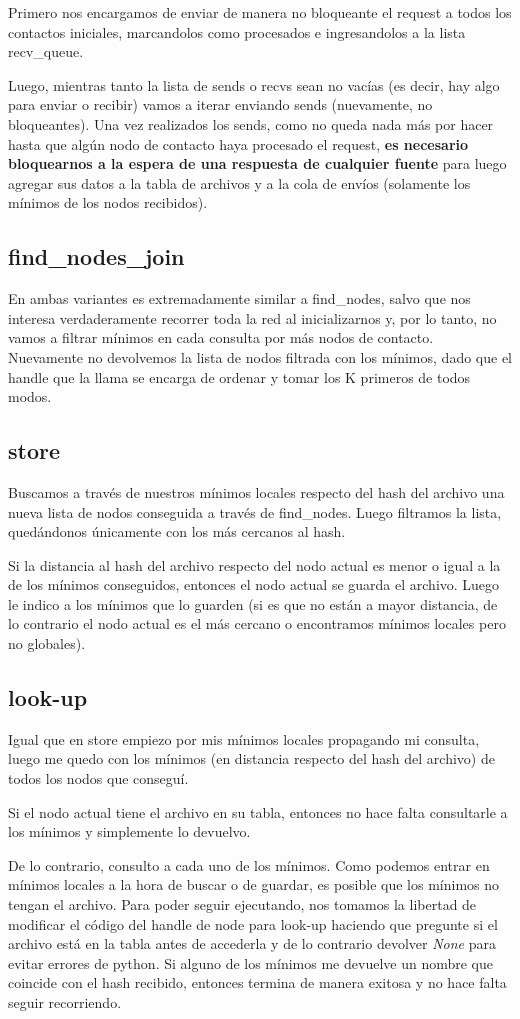             Primero nos encargamos de enviar de manera no bloqueante el request a todos los contactos iniciales, marcandolos como procesados e ingresandolos a la lista recv\_queue.

            Luego, mientras tanto la lista de sends o recvs sean no vacías (es decir, hay algo para enviar o recibir) vamos a iterar enviando sends (nuevamente, no bloqueantes). Una vez realizados los sends, como no queda nada más por hacer hasta que algún nodo de contacto haya procesado el request, \textbf{es necesario bloquearnos a la espera de una respuesta de cualquier fuente} para luego agregar sus datos a la tabla de archivos y a la cola de envíos (solamente los mínimos de los nodos recibidos).

    \subsection{find\_nodes\_join}
            En ambas variantes es extremadamente similar a find\_nodes, salvo que nos interesa verdaderamente recorrer toda la red al inicializarnos y, por lo tanto, no vamos a filtrar mínimos en cada consulta por más nodos de contacto. Nuevamente no devolvemos la lista de nodos filtrada con los mínimos, dado que el handle que la llama se encarga de ordenar y tomar los K primeros de todos modos.

    \subsection{store}
            Buscamos a través de nuestros mínimos locales respecto del hash del archivo una nueva lista de nodos conseguida a través de find\_nodes. Luego filtramos la lista, quedándonos únicamente con los más cercanos al hash.

            Si la distancia al hash del archivo respecto del nodo actual es menor o igual a la de los mínimos conseguidos, entonces el nodo actual se guarda el archivo. Luego le indico a los mínimos que lo guarden (si es que no están a mayor distancia, de lo contrario el nodo actual es el más cercano o encontramos mínimos locales pero no globales).
    \subsection{look-up}
            Igual que en store empiezo por mis mínimos locales propagando mi consulta, luego me quedo con los mínimos (en distancia respecto del hash del archivo) de todos los nodos que conseguí.

            Si el nodo actual tiene el archivo en su tabla, entonces no hace falta consultarle a los mínimos y simplemente lo devuelvo.

            De lo contrario, consulto a cada uno de los mínimos. Como podemos entrar en mínimos locales a la hora de buscar o de guardar, es posible que los mínimos no tengan el archivo. Para poder seguir ejecutando, nos tomamos la libertad de modificar el código del handle de node para look-up haciendo que pregunte si el archivo está en la tabla antes de accederla y de lo contrario devolver \emph{None} para evitar errores de python. Si alguno de los mínimos me devuelve un nombre que coincide con el hash recibido, entonces termina de manera exitosa y no hace falta seguir recorriendo.
